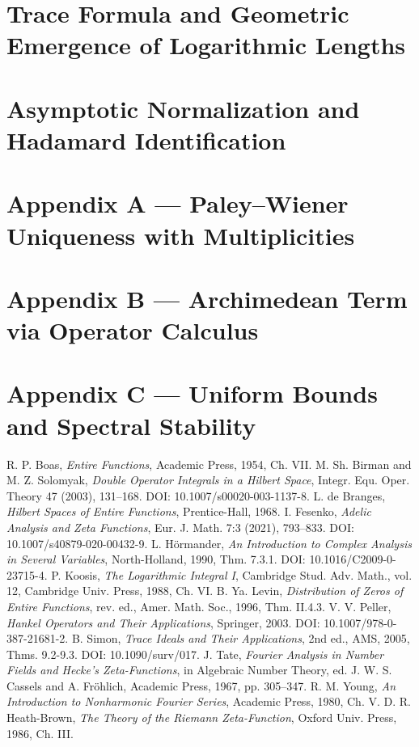 \documentclass[12pt]{article}
\begin{document}
\section{Trace Formula and Geometric Emergence of Logarithmic Lengths}


\section{Asymptotic Normalization and Hadamard Identification}


\appendix

\section*{Appendix A — Paley–Wiener Uniqueness with Multiplicities}


\section*{Appendix B — Archimedean Term via Operator Calculus}


\section*{Appendix C — Uniform Bounds and Spectral Stability}


\begin{thebibliography}{12}
 R. P. Boas, \emph{Entire Functions}, Academic Press, 1954, Ch. VII.
 M. Sh. Birman and M. Z. Solomyak, \emph{Double Operator Integrals in a Hilbert Space}, Integr. Equ. Oper. Theory 47 (2003), 131–168. DOI: 10.1007/s00020-003-1137-8.
 L. de Branges, \emph{Hilbert Spaces of Entire Functions}, Prentice-Hall, 1968.
 I. Fesenko, \emph{Adelic Analysis and Zeta Functions}, Eur. J. Math. 7:3 (2021), 793–833. DOI: 10.1007/s40879-020-00432-9.
 L. Hörmander, \emph{An Introduction to Complex Analysis in Several Variables}, North-Holland, 1990, Thm. 7.3.1. DOI: 10.1016/C2009-0-23715-4.
 P. Koosis, \emph{The Logarithmic Integral I}, Cambridge Stud. Adv. Math., vol. 12, Cambridge Univ. Press, 1988, Ch. VI.
 B. Ya. Levin, \emph{Distribution of Zeros of Entire Functions}, rev. ed., Amer. Math. Soc., 1996, Thm. II.4.3.
 V. V. Peller, \emph{Hankel Operators and Their Applications}, Springer, 2003. DOI: 10.1007/978-0-387-21681-2.
 B. Simon, \emph{Trace Ideals and Their Applications}, 2nd ed., AMS, 2005, Thms. 9.2-9.3. DOI: 10.1090/surv/017.
 J. Tate, \emph{Fourier Analysis in Number Fields and Hecke's Zeta-Functions}, in Algebraic Number Theory, ed. J. W. S. Cassels and A. Fröhlich, Academic Press, 1967, pp. 305–347.
 R. M. Young, \emph{An Introduction to Nonharmonic Fourier Series}, Academic Press, 1980, Ch. V.
 D. R. Heath-Brown, \emph{The Theory of the Riemann Zeta-Function}, Oxford Univ. Press, 1986, Ch. III.
\end{thebibliography}
\end{document}
